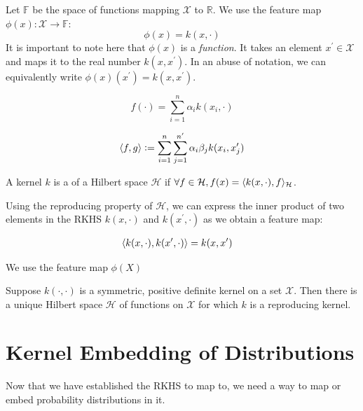 Let $\mathbb{F}$ be the space of functions mapping $\mathcal{X}$ to $\mathbb{R}$. We use the feature map $\phi(x) : \mathcal{X} \to \mathbb{F}$:
\begin{equation}
	\phi(x) = k(x, \cdot)
\end{equation}
It is important to note here that $\phi(x)$ is a \emph{function}. It takes an element $x^\prime \in \mathcal{X}$ and maps it to the real number $k(x, x^\prime)$. In an abuse of notation, we can equivalently write $\phi(x)(x^\prime) = k(x, x^\prime)$.

\begin{equation}
	f(\cdot) = \sum_{i=1}^n \alpha_i k(x_i, \cdot)
\end{equation}

\begin{equation}
	\langle f, g\rangle \vcentcolon= \sum_{i=1}^n \sum_{j=1}^{n^\prime} \alpha_i \beta_j k(x_i, x_j^\prime)
\end{equation}

\begin{definition}
	A kernel $k$ is a  of a Hilbert space $\mathcal{H}$ if $\forall f \in \mathcal{H}, f(x) = \langle k(x, \cdot), f\rangle_\mathcal{H}$.
\end{definition}

Using the reproducing property of $\mathcal{H}$, we can express the inner product of two elements in the RKHS $k(x, \cdot)$ and $k(x^\prime, \cdot)$ as we obtain a feature map:

\begin{align}
	\langle k(x, \cdot), k(x^\prime, \cdot)\rangle &= k(x, x^\prime)
\end{align}

We use the feature map $\phi(X)$



\begin{theorem}
Suppose $k(\cdot, \cdot)$ is a symmetric, positive definite kernel on a set $\mathcal{X}$. Then there is a unique Hilbert space $\mathcal{H}$ of functions on $\mathcal{X}$ for which $k$ is a reproducing kernel.
\end{theorem}

\section{Kernel Embedding of Distributions}
Now that we have established the RKHS to map to, we need a way to map or embed probability distributions in it.

